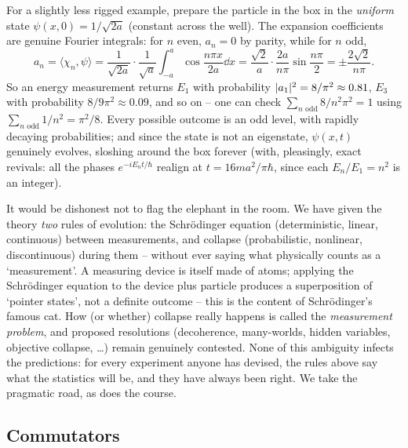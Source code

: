 \documentclass[a4paper]{scrartcl}
\newcommand{\inp}[2]{\langle #1, #2 \rangle}
\begin{document}
\begin{example}
    For a slightly less rigged example, prepare the particle in the box in the \emph{uniform} state $\psi(x, 0) = 1/\sqrt{2a}$ (constant across the well). The expansion coefficients are genuine Fourier integrals: for $n$ even, $a_n = 0$ by parity, while for $n$ odd,
    $$
    a_n = \inp{\chi_n}{\psi} = \frac{1}{\sqrt{2a}} \cdot \frac{1}{\sqrt{a}} \int_{-a}^{a} \cos \frac{n \pi x}{2a} \dd x = \frac{\sqrt{2}}{a} \cdot \frac{2a}{n \pi} \sin \frac{n \pi}{2} = \pm\frac{2 \sqrt{2}}{n \pi}.
    $$
    So an energy measurement returns $E_1$ with probability $\lvert a_1\rvert^2 = 8/\pi^2 \approx 0.81$, $E_3$ with probability $8/9\pi^2 \approx 0.09$, and so on -- one can check $\sum_{n \text{ odd}} 8/n^2\pi^2 = 1$ using $\sum_{n \text{ odd}} 1/n^2 = \pi^2/8$. Every possible outcome is an odd level, with rapidly decaying probabilities; and since the state is not an eigenstate, $\psi(x, t)$ genuinely evolves, sloshing around the box forever (with, pleasingly, exact revivals: all the phases $e^{-iE_n t/\hbar}$ realign at $t = 16ma^2/\pi\hbar$, since each $E_n/E_1 = n^2$ is an integer).
\end{example}

\begin{remark}
    It would be dishonest not to flag the elephant in the room. We have given the theory \emph{two} rules of evolution: the Schr\"odinger equation (deterministic, linear, continuous) between measurements, and collapse (probabilistic, nonlinear, discontinuous) during them -- without ever saying what physically counts as a `measurement'. A measuring device is itself made of atoms; applying the Schr\"odinger equation to the device plus particle produces a superposition of `pointer states', not a definite outcome -- this is the content of Schr\"odinger's famous cat. How (or whether) collapse really happens is called the \emph{measurement problem}, and proposed resolutions (decoherence, many-worlds, hidden variables, objective collapse, \dots) remain genuinely contested. None of this ambiguity infects the predictions: for every experiment anyone has devised, the rules above say what the statistics will be, and they have always been right. We take the pragmatic road, as does the course.
\end{remark}

\subsection{Commutators}
\end{document}
